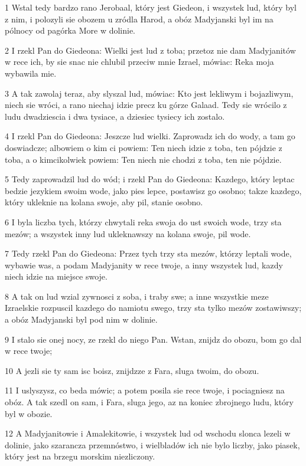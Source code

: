 \par 1 Wstal tedy bardzo rano Jerobaal, który jest Giedeon, i wszystek lud, który byl z nim, i polozyli sie obozem u zródla Harod, a obóz Madyjanski byl im na pólnocy od pagórka More w dolinie.
\par 2 I rzekl Pan do Giedeona: Wielki jest lud z toba; przetoz nie dam Madyjanitów w rece ich, by sie snac nie chlubil przeciw mnie Izrael, mówiac: Reka moja wybawila mie.
\par 3 A tak zawolaj teraz, aby slyszal lud, mówiac: Kto jest lekliwym i bojazliwym, niech sie wróci, a rano niechaj idzie precz ku górze Galaad. Tedy sie wrócilo z ludu dwadziescia i dwa tysiace, a dziesiec tysiecy ich zostalo.
\par 4 I rzekl Pan do Giedeona: Jeszcze lud wielki. Zaprowadz ich do wody, a tam go doswiadcze; albowiem o kim ci powiem: Ten niech idzie z toba, ten pójdzie z toba, a o kimcikolwiek powiem: Ten niech nie chodzi z toba, ten nie pójdzie.
\par 5 Tedy zaprowadzil lud do wód; i rzekl Pan do Giedeona: Kazdego, który leptac bedzie jezykiem swoim wode, jako pies lepce, postawisz go osobno; takze kazdego, który ukleknie na kolana swoje, aby pil, stanie osobno.
\par 6 I byla liczba tych, którzy chwytali reka swoja do ust swoich wode, trzy sta mezów; a wszystek inny lud ukleknawszy na kolana swoje, pil wode.
\par 7 Tedy rzekl Pan do Giedeona: Przez tych trzy sta mezów, którzy leptali wode, wybawie was, a podam Madyjanity w rece twoje, a inny wszystek lud, kazdy niech idzie na miejsce swoje.
\par 8 A tak on lud wzial zywnosci z soba, i traby swe; a inne wszystkie meze Izraelskie rozpuscil kazdego do namiotu swego, trzy sta tylko mezów zostawiwszy; a obóz Madyjanski byl pod nim w dolinie.
\par 9 I stalo sie onej nocy, ze rzekl do niego Pan. Wstan, znijdz do obozu, bom go dal w rece twoje;
\par 10 A jezli sie ty sam isc boisz, znijdzze z Fara, sluga twoim, do obozu.
\par 11 I uslyszysz, co beda mówic; a potem posila sie rece twoje, i pociagniesz na obóz. A tak szedl on sam, i Fara, sluga jego, az na koniec zbrojnego ludu, który byl w obozie.
\par 12 A Madyjanitowie i Amalekitowie, i wszystek lud od wschodu slonca lezeli w dolinie, jako szarancza przemnóstwo, i wielbladów ich nie bylo liczby, jako piasek, który jest na brzegu morskim niezliczony.
